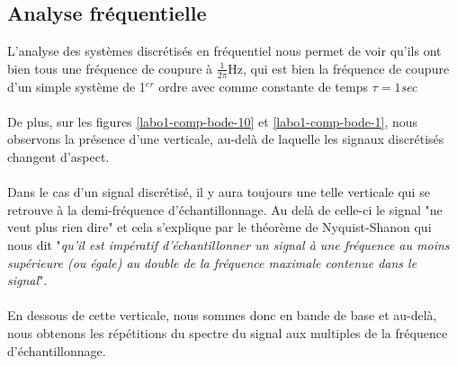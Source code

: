 \subsection{Analyse fréquentielle}
L'analyse des systèmes discrétisés en fréquentiel nous permet de voir qu'ils ont bien tous une fréquence de coupure à $\frac{1}{2\pi}$Hz, qui est bien la fréquence de coupure d'un simple système de 1$^{er}$ ordre avec comme constante de temps $\tau=1$\textit{sec}

\paragraph{}
De plus, sur les figures \ref{labo1-comp-bode-10} et \ref{labo1-comp-bode-1}, nous observons la présence d'une verticale, au-delà de laquelle les signaux discrétisés changent d'aspect.
\paragraph{}
Dans le cas d'un signal discrétisé, il y aura toujours une telle verticale qui se retrouve à la demi-fréquence d'échantillonnage. Au delà de celle-ci le signal "ne veut plus rien dire" et cela s'explique par le théorème de Nyquist-Shanon qui nous dit "\textit{qu'il est impératif d'échantillonner un signal à une fréquence au moins supérieure (ou égale) au double de la fréquence maximale contenue dans le signal}".
\paragraph{}
En dessous de cette verticale, nous sommes donc en bande de base et au-delà, nous obtenons les répétitions du spectre du signal aux multiples de la fréquence d'échantillonnage.

